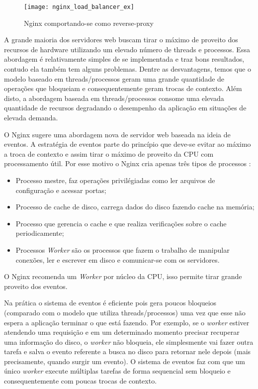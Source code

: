 \begin{figure}[!h]
  \centering
  \texttt{[image: nginx\_load\_balancer\_ex]} 
  \caption[Nginx comportando-se como reverse-proxy]{Nginx comportando-se como reverse-proxy \citep{soni}}
  \label{fig:nginx_basico} 
\end{figure}

A grande maioria dos servidores web buscam tirar o máximo de proveito dos recursos
de hardware utilizando um elevado número de threads e processos. Essa abordagem
é relativamente simples de se implementada e traz bons resultados, contudo ela
também tem alguns problemas. Dentre as desvantagens, temos que o modelo baseado
em threads/processos geram uma grande quantidade de operações que bloqueiam e
consequentemente geram trocas de contexto. Além disto, a abordagem baseada em
threads/processos consome uma elevada quantidade de recursos degradando o
desempenho da aplicação em situações de elevada demanda.

O Nginx sugere uma abordagem nova de servidor web baseada na ideia de eventos.
A estratégia de eventos parte do princípio que deve-se evitar ao máximo a troca
de contexto e assim tirar o máximo de proveito da CPU com processamento útil.
Por esse motivo o Nginx cria apenas três tipos de processos
\citep{nginx_architecture}:

\begin{itemize}
  \item Processo mestre, faz operações privilégiadas como ler arquivos de configuração e acessar portas;
  \item Processo de cache de disco, carrega dados do disco fazendo cache na memória;
  \item Processo que gerencia o cache e que realiza verificações sobre o cache periodicamente;
  \item Processos \textit{Worker} são os processos que fazem o trabalho de manipular conexões, ler e escrever em disco e comunicar-se com os servidores.
\end{itemize}

O Nginx recomenda um \textit{Worker} por núcleo da CPU, isso permite tirar
grande proveito dos eventos.

Na prática o sistema de eventos é eficiente pois gera poucos bloqueios
(comparado com o modelo que utiliza threads/processos) uma vez que esse não
espera a aplicação terminar o que está fazendo. Por exemplo, se o
\textit{worker} estiver atendendo uma requisição e em um determinado momento
precisar recuperar uma informação do disco, o \textit{worker} não bloqueia, ele
simplesmente vai fazer outra tarefa e salva o evento referente a busca no disco
para retornar nele depois (mais precisamente, quando surgir um evento). O
sistema de eventos faz com que um único \textit{worker} execute múltiplas
tarefas de forma sequencial sem bloqueio e consequentemente com poucas trocas
de contexto.

